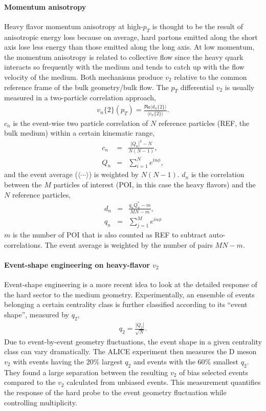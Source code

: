 \paragraph{Momentum anisotropy}
Heavy flavor momentum anisotropy at high-$p_T$ is thought to be the result of anisotropic energy loss because on average, hard partons emitted along the short axis lose less energy than those emitted along the long axis.
At low momentum, the momentum anisotropy is related to collective flow since the heavy quark interacts so frequently with the medium and tends to catch up with the flow velocity of the medium.
Both mechanisms produce $v_2$ relative to the common reference frame of the bulk geometry/bulk flow.
The $p_T$ differential $v_2$ is usually measured in a two-particle correlation approach,
\begin{eqnarray}
v_n\{2\}(p_T) = \frac{\mathfrak{Re}\langle d_n\{2\} \rangle}{\langle c_n\{2\}\rangle}.
\end{eqnarray}
$c_n$ is the event-wise two particle correlation of $N$ reference particles (REF, the bulk medium) within a certain kinematic range,
\begin{eqnarray}
c_n &=& \frac{|Q_n|^2 - N}{N(N-1)},  \\
Q_n &=& \sum_{i=1}^N e^{i n \phi},
\end{eqnarray}
and the event average ($\langle\cdots\rangle$) is weighted by $N(N-1)$.
$d_n$ is the correlation between the $M$ particles of interest (POI, in this case the heavy flavors) and the $N$ reference particles,
\begin{eqnarray}
d_n &=& \frac{q_n Q_n^* - m}{MN-m},  \\
q_n &=& \sum_{j=1}^M e^{i n \phi}
\end{eqnarray}
$m$ is the number of POI that is also counted as REF to subtract auto-correlations. 
The event average is weighted by the number of pairs $MN-m$.

\paragraph{Event-shape engineering on heavy-flavor $v_2$}
Event-shape engineering is a more recent idea to look at the detailed response of the hard sector to the medium geometry.
Experimentally, an ensemble of events belonging a certain centrality class is further classified according to its ``event shape'', measured by $q_2$,
\begin{eqnarray}
q_2 = \frac{|Q_2|}{\sqrt{N}}.
\end{eqnarray}
Due to event-by-event geometry fluctuations, the event shape in a given centrality class can vary dramatically.
The ALICE experiment then measures the D meson $v_2$ with events having the $20\%$ largest $q_2$ and events with the $60\%$ smallest $q_2$.
They found a large separation between the resulting $v_2$ of bias selected events compared to the $v_2$ calculated from unbiased events.
This measurement quantifies the response of the hard probe to the event geometry fluctuation while controlling multiplicity. 

